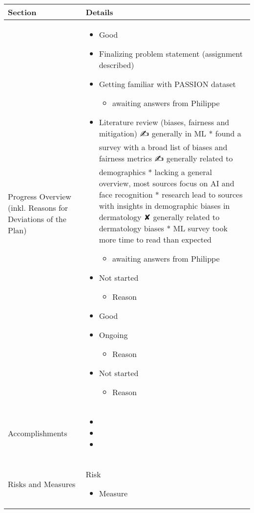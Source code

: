 \documentclass[a4paper,11pt]{article}
\newcommand{\done}{\textcolor{green}{\ding{52}}}
\newcommand{\ongoing}{\textcolor{orange}{\ding{45}}}
\newcommand{\notstarted}{\textcolor{red}{\ding{56}}}
\begin{document}
	
	\renewcommand{\arraystretch}{1.5}
	\begin{longtable}{|p{3.5cm}|p{12cm}|}
		\hline
		\textbf{Section} & \textbf{Details} \\
		\hline
		Progress Overview (inkl. Reasons for Deviations of the Plan) &
		
		\begin{itemize}
			\item[\done] Good
			\item[\ongoing] Finalizing problem statement (assignment described)
			\item[\ongoing] Getting familiar with PASSION dataset
			\begin{itemize}
				\item awaiting answers from Philippe
			\end{itemize}
			\item[\ongoing] Literature review (biases, fairness and mitigation)
			✍ generally in ML
			* found a survey with a broad list of biases and fairness metrics
			✍ generally related to demographics
			* lacking a general overview, most sources focus on AI and face
			recognition
			* research lead to sources with insights in demographic biases in
			dermatology
			✘ generally related to dermatology biases
			* ML survey took more time to read than expected
			
			\begin{itemize}
				\item awaiting answers from Philippe
			\end{itemize}
			\item[\notstarted] Not started
			\begin{itemize}
				\item Reason
			\end{itemize}
		\end{itemize}
		
		
		\begin{itemize}
			\item[\done] Good
			\item[\ongoing] Ongoing
			\begin{itemize}
				\item Reason
			\end{itemize}
			\item[\notstarted] Not started
			\begin{itemize}
				\item Reason
			\end{itemize}
		\end{itemize} \\
			Accomplishments & \begin{itemize}
			\item[\done] 
			\item[\done] 
			\item[\done] 
		\end{itemize} \\
		\hline
		Risks and Measures & 
		Risk
		\begin{itemize}
			\item Measure
		\end{itemize}
		

\end{longtable}
\end{document}
